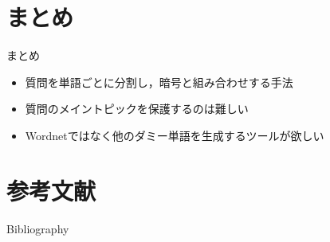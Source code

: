 \documentclass[14pt,xcolor=dvipsnames,table,dvipdfmx]{beamer}
\begin{document}
\section{まとめ}
\begin{frame}{まとめ}
	\begin{block}{}
		\begin{itemize}
			\item 質問を単語ごとに分割し，暗号と組み合わせする手法
			\item 質問のメイントピックを保護するのは難しい
			\item Wordnetではなく他のダミー単語を生成するツールが欲しい
		\end{itemize}
	\end{block}
\end{frame}

\section{参考文献}
\begin{frame}[t,allowframebreaks]{Bibliography}
\fontsize{8pt}{7.2}\selectfont


\end{frame}
\end{document}
